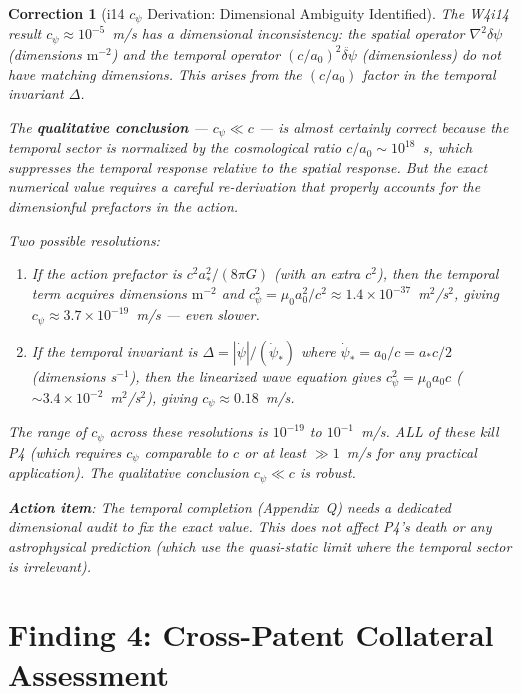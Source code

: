 \documentclass[11pt]{article}
\newtheorem{correction}{Correction}
\newcommand{\ee}[1]{\times 10^{#1}}
\begin{document}
\begin{correction}[i14 $c_\psi$ Derivation: Dimensional Ambiguity Identified]
\label{corr:cpsi-dims}
The W4i14 result $c_\psi \approx 10^{-5}$~m/s has a dimensional
inconsistency: the spatial operator $\nabla^2\delta\psi$ (dimensions
$\text{m}^{-2}$) and the temporal operator $(c/a_0)^2\ddot{\delta\psi}$
(dimensionless) do not have matching dimensions. This arises from the
$(c/a_0)$ factor in the temporal invariant $\Delta$.

The \textbf{qualitative conclusion} --- $c_\psi \ll c$ --- is almost
certainly correct because the temporal sector is normalized by the
cosmological ratio $c/a_0 \sim 10^{18}$~s, which suppresses the temporal
response relative to the spatial response. But the exact numerical value
requires a careful re-derivation that properly accounts for the dimensionful
prefactors in the action.

Two possible resolutions:
\begin{enumerate}[nosep]
\item If the action prefactor is $c^2 a_*^2/(8\pi G)$ (with an extra $c^2$),
  then the temporal term acquires dimensions $\text{m}^{-2}$ and
  $c_\psi^2 = \mu_0 a_0^2/c^2 \approx 1.4\ee{-37}$~m$^2$/s$^2$,
  giving $c_\psi \approx 3.7\ee{-19}$~m/s --- even slower.
\item If the temporal invariant is $\Delta = |\dot\psi|/(\dot\psi_*)$
  where $\dot\psi_* = a_0/c = a_* c/2$ (dimensions s$^{-1}$), then
  the linearized wave equation gives $c_\psi^2 = \mu_0 a_0 c$
  ($\sim 3.4\ee{-2}$~m$^2$/s$^2$), giving $c_\psi \approx 0.18$~m/s.
\end{enumerate}

The range of $c_\psi$ across these resolutions is $10^{-19}$ to
$10^{-1}$~m/s. ALL of these kill P4 (which requires $c_\psi$ comparable
to $c$ or at least $\gg 1$~m/s for any practical application). The
qualitative conclusion $c_\psi \ll c$ is robust.

\textbf{Action item}: The temporal completion (Appendix~Q) needs a
dedicated dimensional audit to fix the exact value. This does not affect
P4's death or any astrophysical prediction (which use the quasi-static
limit where the temporal sector is irrelevant).
\end{correction}


\part{Finding 4: Cross-Patent Collateral Assessment}
\label{part:collateral}
\end{document}
